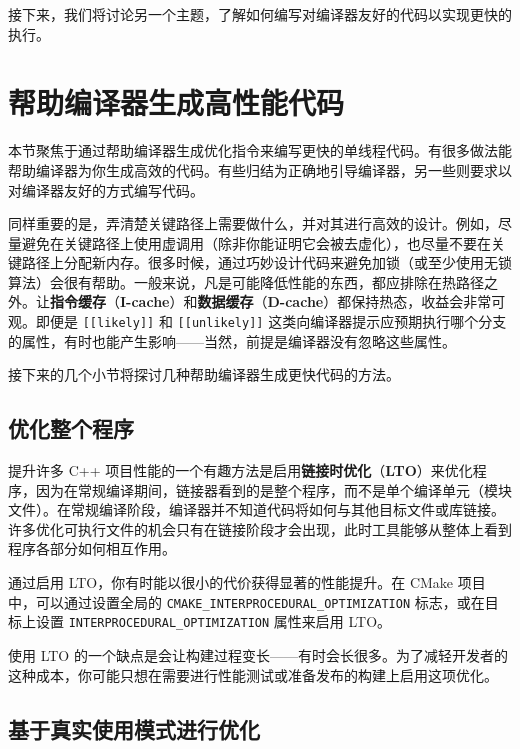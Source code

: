 接下来，我们将讨论另一个主题，了解如何编写对编译器友好的代码以实现更快的执行。

\section{帮助编译器生成高性能代码}

\label{idx:1212}
本节聚焦于通过帮助编译器生成优化指令来编写更快的单线程代码。有很多做法能帮助编译器为你生成高效的代码。有些归结为正确地引导编译器，另一些则要求以对编译器友好的方式编写代码。

\label{idx:1213}
\label{idx:1214}
同样重要的是，弄清楚关键路径上需要做什么，并对其进行高效的设计。例如，尽量避免在关键路径上使用虚调用（除非你能证明它会被去虚化），也尽量不要在关键路径上分配新内存。很多时候，通过巧妙设计代码来避免加锁（或至少使用无锁算法）会很有帮助。一般来说，凡是可能降低性能的东西，都应排除在热路径之外。让\textbf{指令缓存}（\textbf{I-cache}）和\textbf{数据缓存}（\textbf{D-cache}）都保持热态，收益会非常可观。即便是 \texttt{[[likely]]} 和 \texttt{[[unlikely]]} 这类向编译器提示应预期执行哪个分支的属性，有时也能产生影响——当然，前提是编译器没有忽略这些属性。

接下来的几个小节将探讨几种帮助编译器生成更快代码的方法。

\subsection{优化整个程序}

\label{idx:1215}
\label{idx:1216}
\label{idx:1217}
提升许多 C++ 项目性能的一个有趣方法是启用\textbf{链接时优化}（\textbf{LTO}）来优化程序，因为在常规编译期间，链接器看到的是整个程序，而不是单个编译单元（模块文件）。在常规编译阶段，编译器并不知道代码将如何与其他目标文件或库链接。许多优化可执行文件的机会只有在链接阶段才会出现，此时工具能够从整体上看到程序各部分如何相互作用。

通过启用 LTO，你有时能以很小的代价获得显著的性能提升。在 CMake 项目中，可以通过设置全局的 \texttt{CMAKE\_\allowbreak{}INTERPROCEDURAL\_\allowbreak{}OPTIMIZATION} 标志，或在目标上设置 \texttt{INTERPROCEDURAL\_\allowbreak{}OPTIMIZATION} 属性来启用 LTO。

\label{idx:1218}
使用 LTO 的一个缺点是会让构建过程变长——有时会长很多。为了减轻开发者的这种成本，你可能只想在需要进行性能测试或准备发布的构建上启用这项优化。

\subsection{基于真实使用模式进行优化}

